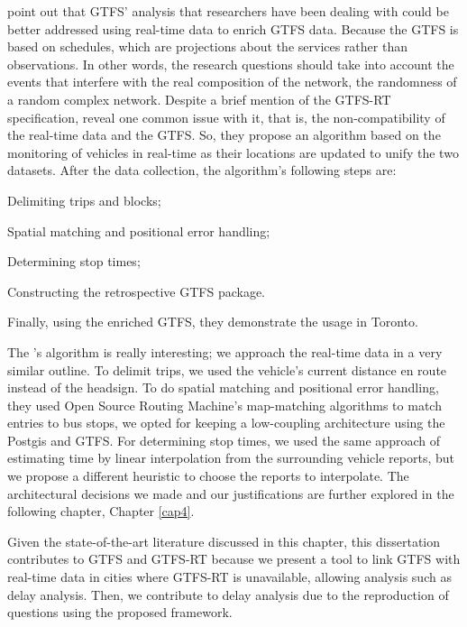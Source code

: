  point out that GTFS' analysis that researchers
have been dealing with could be better addressed using real-time data to enrich 
GTFS data. Because the GTFS is based on schedules, which are projections 
about the services rather than observations.
In other words, the research questions should take into account the events
that interfere with the real composition of the network, the randomness of 
a random complex network. Despite a brief mention of the GTFS-RT
specification,  reveal one common issue with it,
that is, the non-compatibility of the real-time data and the GTFS. So, they 
propose an algorithm based on the monitoring of vehicles in real-time as their
locations are updated to unify the two datasets. After the data collection,
the algorithm's following steps are: 
\begin{enumerate*}
    \item Delimiting trips and blocks;
    \item Spatial matching and positional error handling;
    \item Determining stop times;
    \item Constructing the retrospective GTFS package.
\end{enumerate*}
Finally, using the enriched GTFS, they demonstrate the usage in Toronto.

The 's algorithm is really interesting; we
approach the real-time data in a very similar outline. 
To delimit trips, we used the vehicle's current distance en route instead of 
the headsign. To do spatial matching and positional error handling, they used
Open Source Routing Machine's map-matching algorithms to match entries to 
bus stops, we opted for keeping a low-coupling architecture using the 
Postgis and GTFS. 
For determining stop times, we used the same approach of estimating time
by linear interpolation from the surrounding vehicle reports, but we propose 
a different heuristic to choose the reports to interpolate.
The architectural decisions we made and our justifications are further explored in
the following chapter, Chapter \ref{cap4}.

Given the state-of-the-art literature discussed in this chapter,
this dissertation contributes to GTFS and GTFS-RT because we present
a tool to link GTFS with real-time data in cities where GTFS-RT is unavailable, allowing analysis such as delay analysis. Then, we contribute to 
delay analysis due to the reproduction of questions using the proposed framework.
